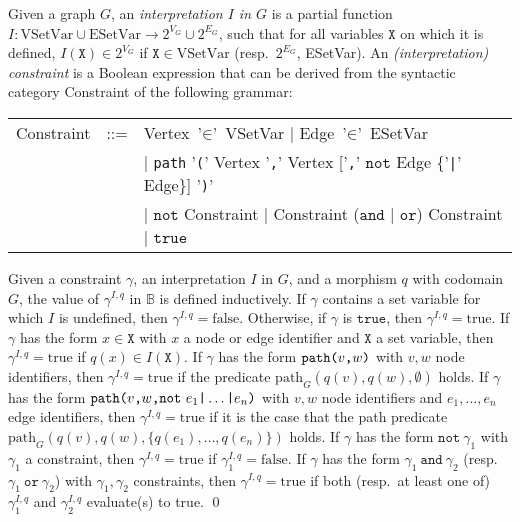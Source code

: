 \documentclass{llncs}
\newcommand{\mt}[1]{\text{\tt{#1}}}
\begin{document}
	
	\begin{definition}\label{def:interpretation}\rm
		Given a graph $G$, an \emph{interpretation $I$ in $G$} is a partial function $I\!:\text{VSetVar}\cup\text{ESetVar}\rightarrow2^{V_G} \cup 2^{E_G}$, such that for all variables $\mathtt{X}$ on which it is defined, $I(\mathtt{X}) \in 2^{V_G}$ if $\mathtt{X}\in \text{VSetVar}$ (resp.\ $2^{E_G}$, ESetVar). An \emph{(interpretation) constraint} is a Boolean expression that can be derived from the syntactic category Constraint of the following grammar:
	

	\begin{center}
			\begin{tabular}{lcl}
		Constraint & ::= & Vertex$\ \text{'}\mathtt{\in}\text{'}\ $VSetVar  $\mid$ Edge$\ \text{'}\mathtt{\in}\text{'}\ $ESetVar\\
					& & $\mid$ \verb#path# '\verb#(#' Vertex '\verb#,#' Vertex ['\verb#,#' $\mathtt{not}$ Edge \{'\verb#|#' Edge\}] '\verb#)#'\\
					& & $\mid$ $\mathtt{not}$ Constraint $\mid$ Constraint ($\mathtt{and}$ $\mid$ $\mathtt{or}$) Constraint $\mid$ $\mathtt{true}$ \\
			\end{tabular}
	\end{center}

	
	Given a constraint $\gamma$, an interpretation $I$ in $G$, and a morphism $q$ with codomain $G$, the value of $\gamma^{I,q}$ in $\mathbb{B}$ is defined inductively. If $\gamma$ contains a set variable for which $I$ is undefined, then $\gamma^{I,q} = \text{false}$. Otherwise, if $\gamma$ is $\mathtt{true}$, then $\gamma^{I,q} = \text{true}$. If $\gamma$ has the form $x\in\mathtt{X}$ with $x$ a node or edge identifier and $\mathtt{X}$ a set variable, then $\gamma^{I,q}=\text{true}$ if $q(x) \in I(\mathtt{X})$. If $\gamma$ has the form $\mathtt{path}\mt{(}v\mt{,}w\mt{)}$ with $v,w$ node identifiers, then $\gamma^{I,q}=\text{true}$ if the predicate $\text{path}_G(q(v),q(w),\emptyset)$ holds. If $\gamma$ has the form $\mathtt{path}\mt{(}v\mt{,}w\mt{,}\mathtt{not}\ e_1\mt{|}\dots\mt{|}e_n\mt{)}$ with $v,w$ node identifiers and $e_1,\dots,e_n$ edge identifiers, then $\gamma^{I,q}=\text{true}$ if it is the case that the path predicate $\text{path}_G(q(v),q(w),\{q(e_1),\dots,q(e_n)\})$ holds. If $\gamma$ has the form $\mathtt{not}\ \gamma_1$ with $\gamma_1$ a constraint, then $\gamma^{I,q} = \text{true}$ if $\gamma_1^{I,q} = \text{false}$. If $\gamma$ has the form $\gamma_1\ \mathtt{and}\ \gamma_2$ (resp.\ $\gamma_1\ \mathtt{or}\ \gamma_2$) with $\gamma_1,\gamma_2$ constraints, then $\gamma^{I,q} = \text{true}$ if both (resp.\ at least one of) $\gamma_1^{I,q}$ and $\gamma_2^{I,q}$ evaluate(s) to true.
		\qed
	\end{definition}
\end{document}
